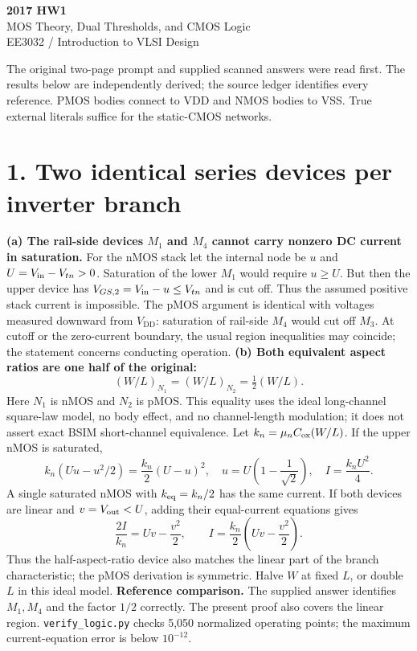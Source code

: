 \documentclass[11pt,a4paper]{article}
\newcommand{\VDD}{V_{\mathrm{DD}}}
\begin{document}
\begin{center}{\LARGE\bfseries 2017 HW1}\\[4pt]{\large MOS Theory, Dual Thresholds, and CMOS Logic}\\[4pt]{\small EE3032 / Introduction to VLSI Design}\end{center}
The original two-page prompt and supplied scanned answers were read first. The results below are independently derived; the source ledger identifies every reference. PMOS bodies connect to VDD and NMOS bodies to VSS. True external literals suffice for the static-CMOS networks.
\section*{1. Two identical series devices per inverter branch}
\textbf{(a) The rail-side devices $M_1$ and $M_4$ cannot carry nonzero DC current in saturation.}
For the nMOS stack let the internal node be $u$ and $U=V_{\rm in}-V_{tn}>0$.
Saturation of the lower $M_1$ would require $u\ge U$. But then the upper device has
$V_{GS,2}=V_{\rm in}-u\le V_{tn}$ and is cut off. Thus the assumed positive stack current is impossible. The pMOS argument is identical with voltages measured downward from $\VDD$: saturation of rail-side $M_4$ would cut off $M_3$.
At cutoff or the zero-current boundary, the usual region inequalities may coincide; the statement concerns conducting operation.
\textbf{(b) Both equivalent aspect ratios are one half of the original:}
\[
 \boxed{(W/L)_{N_1}=(W/L)_{N_2}=\tfrac 12(W/L).}
\]
Here $N_1$ is nMOS and $N_2$ is pMOS. This equality uses the ideal long-channel square-law model, no body effect, and no channel-length modulation; it does not assert exact BSIM short-channel equivalence.
Let $k_n=\mu_n C_{\rm ox}(W/L)$. If the upper nMOS is saturated,
\[
 k_n(Uu-u^2/2)=\frac{k_n}{2}(U-u)^2,
 \quad u=U\left(1-\frac 1{\sqrt 2}\right),
 \quad I=\frac{k_nU^2}{4}.
\]
A single saturated nMOS with $k_{\rm eq}=k_n/2$ has the same current. If both devices are linear and $v=V_{\rm out}<U$, adding their equal-current equations gives
\[
 \frac{2I}{k_n}=Uv-\frac{v^2}{2},\qquad
 I=\frac{k_n}{2}\left(Uv-\frac{v^2}{2}\right).
\]
Thus the half-aspect-ratio device also matches the linear part of the branch characteristic; the pMOS derivation is symmetric. Halve $W$ at fixed $L$, or double $L$ in this ideal model.
\textbf{Reference comparison.} The supplied answer identifies $M_1,M_4$ and the factor $1/2$ correctly. The present proof also covers the linear region. \texttt{verify\_logic.py} checks 5,050 normalized operating points; the maximum current-equation error is below $10^{-12}$.
\end{document}
